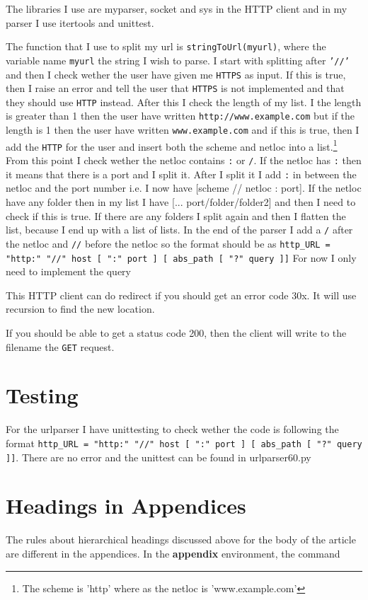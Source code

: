 \documentclass{sig-alternate-05-2015}
\begin{document}
The libraries I use are myparser, socket and sys in the HTTP client and in my parser I use itertools and unittest.

The function that I use to split my url is \texttt{stringToUrl(myurl)}, where the variable name \texttt{myurl} the string I wish to parse.
I start with splitting after \texttt{'//'} and then I check wether the user have given me \texttt{HTTPS} as input. If this is true, then I raise an error and tell the user that \texttt{HTTPS} is not implemented and that they should use \texttt{HTTP} instead.
After this I check the length of my list. I the length is greater than 1 then the user have written \texttt{http://www.example.com} but if the length is 1 then the user have written \texttt{www.example.com} and if this is true, then I add the \texttt{HTTP} for the user and insert both the scheme and netloc into a list.\footnote{The scheme is 'http' where as the netloc is 'www.example.com'}
From this point I check wether the netloc contains \texttt{:} or \texttt{/}. If the netloc has \texttt{:} then it means that there is a port and I split it. After I split it I add \texttt{:} in between the netloc and the port number i.e. I now have [scheme // netloc : port]. If the netloc have any folder then in my list I have [... port/folder/folder2] and then I need to check if this is true. If there are any folders I split again and then I flatten the list, because I end up with a list of lists. In the end of the parser I add a \texttt{/} after the netloc and \texttt{//} before the netloc so the format should be as \texttt{http_URL = "http:" "//" host [ ":" port ] [ abs_path [ "?" query ]]}
For now I only need to implement the query


This HTTP client can do redirect if you should get an error code 30x. It will use recursion to find the new location.

If you should be able to get a status code 200, then the client will write to the filename the \texttt{GET} request.

\section{Testing}
For the urlparser I have unittesting to check wether the code is following the format \texttt{http_URL = "http:" "//" host [ ":" port ] [ abs_path [ "?" query ]]}. There are no error and the unittest can be found in urlparser60.py




\appendix
\section{Headings in Appendices}
The rules about hierarchical headings discussed above for
the body of the article are different in the appendices.
In the \textbf{appendix} environment, the command

\end{document}
